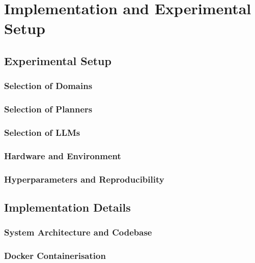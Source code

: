 \chapter{Implementation and Experimental Setup}\label{ch:realisation}

\section{Experimental Setup}
\label{sec:real:setup}

\subsection{Selection of Domains}
\label{sec:real:domains}

\subsection{Selection of Planners}
\label{sec:real:planners}

\subsection{Selection of LLMs}
\label{sec:real:llms}

\subsection{Hardware and Environment}
\label{sec:real:hardware}

\subsection{Hyperparameters and Reproducibility}
\label{sec:real:hyperparameters}

\section{Implementation Details}
\label{sec:real:implementation}

\subsection{System Architecture and Codebase}
\label{sec:real:codebase}

\subsection{Docker Containerisation}
\label{sec:real:docker}

